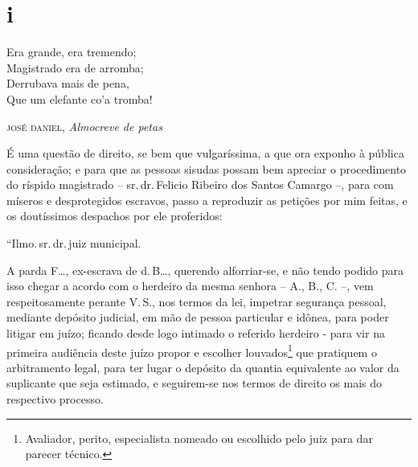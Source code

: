 \section{i}

\epigraph{Era grande, era tremendo;\\
Magistrado era de arromba;\\
Derrubava mais de pena,\\
Que um elefante co'a tromba!}{\textsc{josé daniel}\footnotemark, \emph{Almocreve de petas}\footnotemark}




É uma questão de direito, se bem que vulgaríssima, a que ora exponho à
pública consideração; e para que as pessoas sisudas possam bem apreciar
o procedimento do ríspido magistrado -- sr.\,dr.\,Felicio Ribeiro dos
Santos Camargo --, para com míseros e desprotegidos escravos, passo a
reproduzir as petições por mim feitas, e os doutíssimos despachos por
ele proferidos:

``Ilmo.\,sr.\,dr.\,juiz municipal.

A parda F\ldots{}, ex-escrava de d.\,B\ldots{}, querendo alforriar-se, e não tendo
podido para isso chegar a acordo com o herdeiro da mesma senhora -- A.,
B., C. --, vem respeitosamente perante V.\,S., nos termos da lei,
impetrar segurança pessoal, mediante depósito judicial, em mão de pessoa
particular e idônea, para poder litigar em juízo; ficando desde logo
intimado o referido herdeiro - para vir na primeira audiência deste
juízo propor e escolher louvados\footnote{ Avaliador, perito,
  especialista nomeado ou escolhido pelo juiz para dar parecer técnico.}
que pratiquem o arbitramento legal, para ter lugar o depósito da quantia
equivalente ao valor da suplicante que seja estimado, e seguirem-se nos
termos de direito os mais do respectivo processo.

